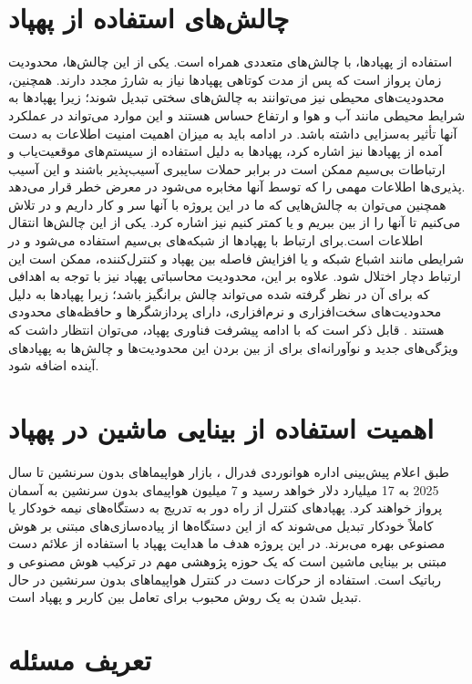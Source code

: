  \section{چالش‌های استفاده از پهپاد}
 استفاده از پهپادها، با چالش‌های متعددی همراه است. یکی از این چالش‌ها، محدودیت زمان پرواز است که پس از مدت کوتاهی پهپاد‌ها نیاز به شارژ مجدد دارند. 
 همچنین، محدودیت‌های محیطی نیز می‌توانند به چالش‌های سختی تبدیل شوند؛ زیرا پهپادها به شرایط محیطی مانند آب و هوا و ارتفاع حساس هستند و این موارد می‌تواند 
 در عملکرد آنها تأثیر به‌سزایی داشته باشد. در ادامه باید به میزان اهمیت امنیت اطلاعات به دست آمده از پهپاد‌ها نیز اشاره کرد، پهپادها به دلیل استفاده از سیستم‌های موقعیت‌یاب و ارتباطات بی‌سیم ممکن 
 است در برابر حملات سایبری آسیب‌پذیر باشند و این آسیب پذیری‌ها اطلاعات مهمی را که توسط آنها مخابره می‌شود در معرض خطر قرار می‌دهد.
 \\
 همچنین می‌توان به چالش‌هایی که ما در این پروژه با آنها سر و کار داریم و در تلاش می‌کنیم تا آنها را از بین ببریم و یا کمتر کنیم نیز اشاره کرد. 
   یکی از این چالش‌ها انتقال اطلاعات است.برای ارتباط با پهپادها از شبکه‌های بی‌سیم استفاده می‌شود و در شرایطی مانند اشباع شبکه  و یا افزایش فاصله بین پهپاد و کنترل‌کننده، ممکن است این ارتباط دچار اختلال شود.
 علاوه بر این، محدودیت محاسباتی پهپاد نیز با توجه به اهدافی که برای آن در نظر گرفته شده می‌تواند چالش برانگیز باشد؛ زیرا پهپادها به دلیل محدودیت‌های سخت‌افزاری و نرم‌افزاری، دارای پردازشگرها و حافظه‌های محدودی هستند \cite{hassanalian2017classifications}.
 قابل ذکر است که با ادامه پیشرفت فناوری پهپاد، می‌توان انتظار داشت که ویژگی‌های جدید و نوآورانه‌ای برای از بین بردن این محدودیت‌ها و چالش‌ها به‌ پهپادهای آینده اضافه شود.

 \section{اهمیت استفاده از بینایی ماشین در پهپاد}
 طبق اعلام پیش‌بینی اداره هوانوردی فدرال
 ، بازار هواپیماهای بدون سرنشین تا سال 2025 به 17 میلیارد دلار خواهد رسید و 7 میلیون هواپیمای بدون سرنشین به آسمان پرواز خواهند‌ کرد. پهپادهای کنترل
 از راه دور به تدریج به دستگاه‌های نیمه خودکار یا کاملاً خودکار تبدیل می‌شوند که از این دستگاه‌‌ها از پیاده‌سازی‌های مبتنی بر هوش مصنوعی بهره می‌برند. 
 در این پروژه هدف ما هدایت پهپاد با استفاده از علائم دست مبتنی بر بینایی ماشین است که یک حوزه پژوهشی مهم در ترکیب هوش مصنوعی و رباتیک است. 
 استفاده از حرکات دست در کنترل هواپیماهای بدون سرنشین در حال تبدیل شدن به یک روش محبوب برای تعامل بین کاربر و پهپاد است. 
 

\section{تعریف مسئله}

